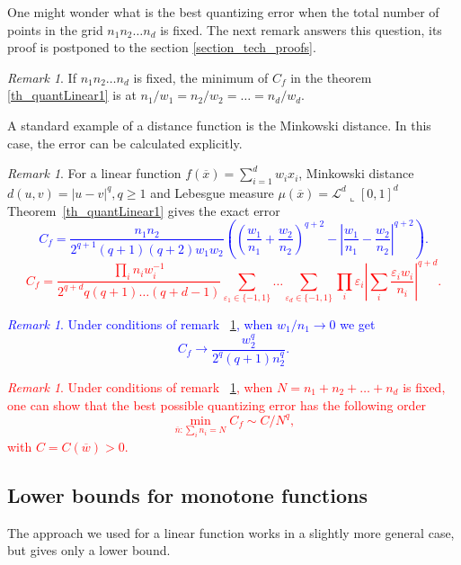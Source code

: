 \documentclass{amsart}
\theoremstyle{remark}
\newtheorem{remark}[theorem]{Remark}
\numberwithin{equation}{section}
\numberwithin{figure}{section}
\def\eps{\varepsilon}
\def\v{\overline}
\newcommand{\res}{\llcorner}
\begin{document}
One might wonder what is the best quantizing error when the total number of points in the grid $n_1 n_2 \ldots n_d$ is fixed. The next remark answers this question, its proof is postponed to the section \ref{section_tech_proofs}.
\begin{remark}
	\label{rem_linear}
	If $n_1 n_2 \ldots n_d$ is fixed, the minimum of $C_f$ in the theorem \ref{th_quantLinear1} is at $n_1/w_1 = n_2/w_2 = \ldots = n_d/w_d$. 
\end{remark}	

A standard example of a distance function is the Minkowski distance. In this case, the error can be calculated explicitly.

\begin{remark}
	\label{rem_exact_err}
	For a linear function  $f(\v x) = \sum_{i = 1}^d w_i x_i$, Minkowski distance $d(u, v) = |u-v|^q, q \geq 1$ and Lebesgue measure $\mu(\v x) = \mathcal{L}^d\res [0,1]^d $ Theorem~\ref{th_quantLinear1} gives the exact error
	\textcolor{blue}{\[
	C_f = \frac{n_1 n_2}{2^{q+1}(q+1)(q+2)w_1w_2}\left(\left(\frac{w_1}{n_1}+\frac{w_2}{n_2}\right)^{q+2} - \left|\frac{w_1}{n_1}-\frac{w_2}{n_2}\right|^{q+2}\right).
	\]}
	\textcolor{red}{\[
	C_f = \frac{\prod_i n_i w_i^{-1}}{2^{q+d} q(q+1) \ldots (q+d-1)} \sum_{\eps_1 \in \{-1, 1\}} \ldots \sum_{\eps_d \in \{-1, 1\}} \prod_i \eps_{i} \left|\sum_i \frac{\eps_i w_i}{n_i}\right|^{q+d}.
	\]}
\end{remark}	


\textcolor{blue}{\begin{remark}
	Under conditions of remark ~\ref{rem_exact_err}, when $w_1/n_1 \to 0$ we get
	\[
	C_f \to \frac{w_2^q}{2^q (q+1) n_2^q}.
	\]
\end{remark}}

\textcolor{red}{\begin{remark}
	\label{loss_asymp}
	Under conditions of remark ~\ref{rem_exact_err}, when $N= n_1+n_2+\ldots + n_d$ is fixed, one can show that the best possible quantizing error has the following order
	\[
	\min_{\v n: \sum_i n_i = N} C_f \sim C/N^q,
	\]
	with $C=C(\v w)>0$.
\end{remark}}

\subsection{Lower bounds for monotone functions}
The approach we used for a linear function works in a slightly more general case, but gives only a lower bound.
\end{document}

